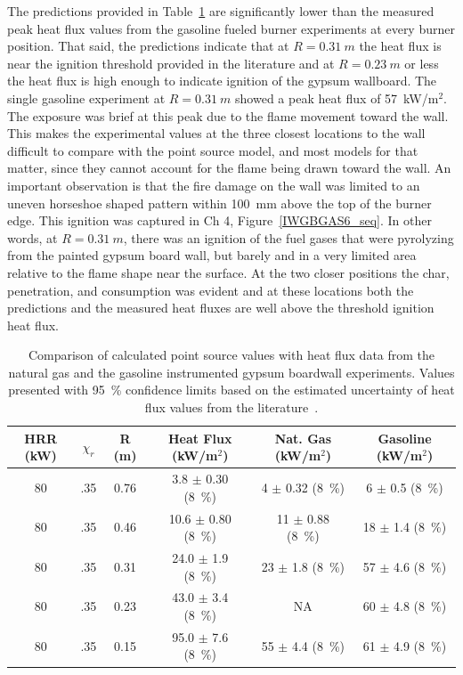 \documentclass[twoside]{uocthesis}
\begin{document}
{The predictions provided in Table~\ref{tab:Point_Source_HFNGG} are significantly lower than the measured peak heat flux values from the gasoline fueled burner experiments at every burner position.  That said, the predictions indicate that at $R=0.31~m$  the heat flux is near the ignition threshold provided in the literature and at $R=0.23~m$ or less the heat flux is high enough to indicate ignition of the gypsum wallboard.  The single gasoline experiment at $R=0.31~m$ showed a peak heat flux of 57~kW/m$^2$.  The exposure was brief at this peak due to the flame movement toward the wall.  This makes the experimental values at the three closest locations to the wall difficult to compare with the point source model, and most models for that matter, since they cannot account for the flame being drawn toward the wall.  An important observation is that the fire damage on the wall was limited to an uneven horseshoe shaped pattern within 100~mm above the top of the burner edge.  This ignition was captured in Ch 4, Figure~\ref{IWGBGAS6_seq}. In other words, at $R=0.31~m$, there was an ignition of the fuel gases that were pyrolyzing from the painted gypsum board wall, but barely and in a very limited area relative to the flame shape near the surface.  At the two closer positions the char, penetration, and consumption was evident and at these locations both the predictions and the measured heat fluxes are well above the threshold ignition heat flux.                     

\begin{table}
	\centering
	\footnotesize
	\begin{tabular}{|c|c|c|c|c|c|}
	\hline
		HRR (kW) &   $\chi_r$   & R (m)	 & Heat Flux (kW/m$^2$)     &  Nat. Gas (kW/m$^2$)      & Gasoline (kW/m$^2$) 	\\ \hline \hline
		80    &   .35 		& 0.76 	     & 3.8 $\pm$ 0.30 (8~\%) 	&  4 $\pm$ 0.32 (8~\%) 	 	   & 6 $\pm$ 0.5 (8~\%)     \\
		80    &   .35    	& 0.46	     & 10.6 $\pm$ 0.80 (8~\%) 	&  11 $\pm$ 0.88 (8~\%)  	   & 18 $\pm$ 1.4 (8~\%)    \\
		80    &   .35 		& 0.31	     & 24.0 $\pm$ 1.9 (8~\%) 	&  23 $\pm$ 1.8 (8~\%)  	   & 57 $\pm$ 4.6 (8~\%)     \\
        80    &   .35 		& 0.23	     & 43.0 $\pm$ 3.4 (8~\%) 	&  NA 					  	   & 60 $\pm$ 4.8 (8~\%)     \\
        80    &   .35 		& 0.15	     & 95.0 $\pm$ 7.6 (8~\%) 	&  55 $\pm$ 4.4 (8~\%)  	   & 61 $\pm$ 4.9 (8~\%)     \\
	\hline
	\end{tabular}
	\caption[Comparison of calculated point source values (HRR = 80~kW) with heat flux data from the instrumented gypsum boardwall experiments]{Comparison of calculated point source values with heat flux data from the natural gas and the gasoline instrumented gypsum boardwall experiments. Values presented with 95~\% confidence limits based on the estimated uncertainty of heat flux values from the literature~\cite{Pitts:2006}.}
	\label{tab:Point_Source_HFNGG}
\end{table} 

}
\end{document}
